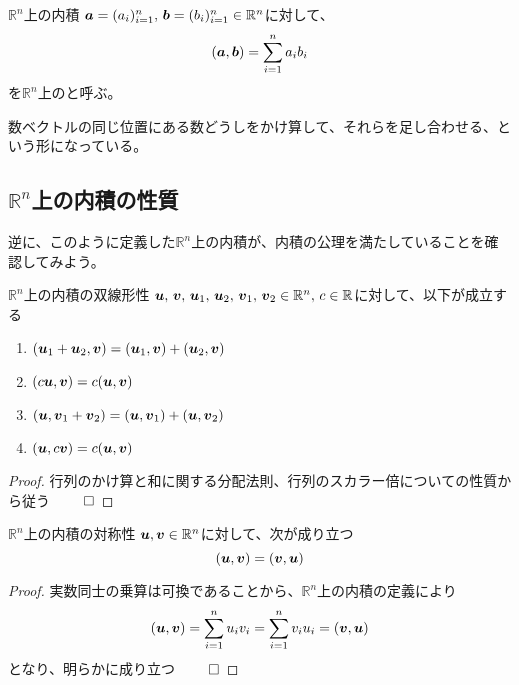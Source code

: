 \documentclass[../../../topic_linear-algebra]{subfiles}
\begin{document}
\begin{definition}{$\mathbb{R}^n$上の内積}
  $\vb*{a} = (a_i)_{i=1}^n,\, \vb*{b} = (b_i)_{i=1}^n \in \mathbb{R}^n$に対して、
  \begin{equation*}
    (\vb*{a}, \vb*{b}) = \sum_{i=1}^n a_i b_i
  \end{equation*}
  を$\mathbb{R}^n$上のと呼ぶ。
\end{definition}

数ベクトルの同じ位置にある数どうしをかけ算して、それらを足し合わせる、という形になっている。

\subsection{$\mathbb{R}^n$上の内積の性質}

逆に、このように定義した$\mathbb{R}^n$上の内積が、内積の公理を満たしていることを確認してみよう。

\begin{theorem}{$\mathbb{R}^n$上の内積の双線形性}
  $\vb*{u},\,\vb*{v},\,\vb*{u}_1,\,\vb*{u}_2,\,\vb*{v}_1,\,\vb*{v}_2 \in \mathbb{R}^n,\,c\in \mathbb{R}$に対して、以下が成立する
  \begin{enumerate}[label=\romanlabel]
    \item $(\vb*{u}_1 + \vb*{u}_2, \vb*{v}) = (\vb*{u}_1, \vb*{v}) + (\vb*{u}_2, \vb*{v})$
    \item $(c\vb*{u}, \vb*{v}) = c(\vb*{u}, \vb*{v})$
    \item $(\vb*{u}, \vb*{v}_1 + \vb*{v}_2) = (\vb*{u}, \vb*{v}_1) + (\vb*{u}, \vb*{v}_2)$
    \item $(\vb*{u}, c\vb*{v}) = c(\vb*{u}, \vb*{v})$
  \end{enumerate}
\end{theorem}

\begin{proof}
  行列のかけ算と和に関する分配法則、行列のスカラー倍についての性質から従う $\qed$
\end{proof}

\br

\begin{theorem}{$\mathbb{R}^n$上の内積の対称性}
  $\vb*{u}, \vb*{v} \in \mathbb{R}^n$に対して、次が成り立つ
  \begin{equation*}
    (\vb*{u}, \vb*{v}) = (\vb*{v}, \vb*{u})
  \end{equation*}
\end{theorem}

\begin{proof}
  実数同士の乗算は可換であることから、$\mathbb{R}^n$上の内積の定義により
  \begin{equation*}
    (\vb*{u}, \vb*{v}) = \sum_{i=1}^n u_i v_i = \sum_{i=1}^n v_i u_i = (\vb*{v}, \vb*{u})
  \end{equation*}
  となり、明らかに成り立つ $\qed$
\end{proof}
\end{document}
